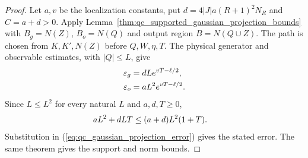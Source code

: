 \begin{proof}\leanok
    Let $a,v$ be the localization constants, put
    $d=4|J|a(R+1)^2N_R$ and $C=a+d>0$.
    Apply Lemma~\ref{thm:qc_supported_gaussian_projection_bounds} with
    $B_g=N(Z)$, $B_o=N(Q)$ and output region $B=N(Q\cup Z)$.
    The path is chosen from $K,K',N(Z)$ before $Q,W,\eta,T$.
    The physical generator and observable estimates, with $|Q|\le L$, give
    \begin{align}
        \varepsilon_g & =dLe^{vT-\ell/2},\notag   \\
        \varepsilon_o & =aL^2e^{vT-\ell/2}.\notag
    \end{align}
    Since $L\le L^2$ for every natural $L$ and $a,d,T\ge0$,
    \begin{align}
        aL^2+dLT & \le(a+d)L^2(1+T).\notag
    \end{align}
    Substitution in (\ref{eq:qc_gaussian_projection_error}) gives the stated
    error. The same theorem gives the support and norm bounds.
\end{proof}

